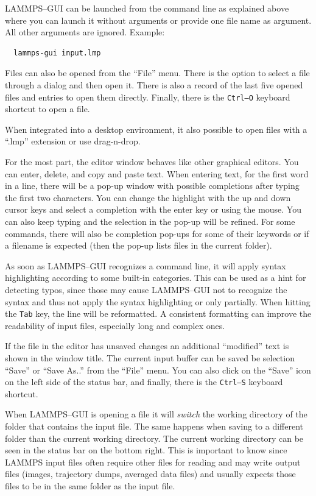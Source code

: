 \documentclass[9pt,tutorial]{livecoms}
\begin{document}
\begin{appendices}
LAMMPS--GUI can be launched from the command line as explained above where you
can launch it without arguments or provide one file name as argument.  All
other arguments are ignored. Example:
{
\normalsize
\begin{verbatim}
  lammps-gui input.lmp
\end{verbatim}
}
Files can also be opened from the ``File'' menu.  There is the option to
select a file through a dialog and then open it.  There is also a record
of the last five opened files and entries to open them directly.
Finally, there is the \texttt{Ctrl--O} keyboard shortcut to open a file.

When integrated into a desktop environment, it also possible to open files
with a ``.lmp'' extension or use drag-n-drop.

For the most part, the editor window behaves like other graphical editors.
You can enter, delete, and copy and paste text.  When entering text, for
the first word in a line, there will be a pop-up window with possible
completions after typing the first two characters. You can change the highlight
with the up and down cursor keys and select a completion with the enter key
or using the mouse.  You can also keep typing and the selection in the pop-up
will be refined.  For some commands, there will also be completion pop-ups for some
of their keywords or if a filename is expected (then the pop-up lists files
in the current folder).

As soon as LAMMPS--GUI recognizes a command line, it will apply syntax highlighting
according to some built-in categories.  This can be used as a hint for detecting
typos, since those may cause LAMMPS--GUI not to recognize the syntax and thus
not apply the syntax highlighting or only partially.  When hitting the \texttt{Tab}
key, the line will be reformatted.  A consistent formatting can improve the readability
of input files, especially long and complex ones.

If the file in the editor has unsaved changes an additional ``\*modified\*''
text is shown in the window title.
The current input buffer can be saved be selection ``Save'' or ``Save As..'' from
the ``File'' menu.  You can also click on the ``Save'' icon on the left side
of the status bar, and finally, there is the \texttt{Ctrl--S} keyboard shortcut.


\begin{note}
When LAMMPS--GUI is opening a file it will \emph{switch} the working directory
of the folder that contains the input file.  The same happens when saving to
a different folder than the current working directory.  The current working
directory can be seen in the status bar on the bottom right.  This is important
to know since LAMMPS input files often require other files for reading and may
write output files (images, trajectory dumps, averaged data files) and usually
expects those files to be in the same folder as the input file.
\end{note}


\end{appendices}
\end{document}
